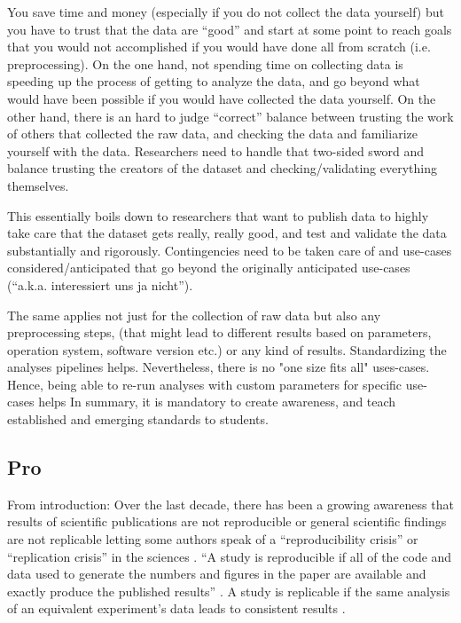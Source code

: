 %
You save time and money (especially if you do not collect the data yourself) but
you have to trust that the data are ``good'' and start at some point to reach
goals that you would not accomplished if you would have done all from scratch
(i.e. preprocessing).
%
On the one hand, not spending time on collecting data is speeding up the process
of getting to analyze the data, and go beyond what would have been possible if
you would have collected the data yourself.
%
On the other hand, there is an hard to judge ``correct'' balance between
trusting the work of others that collected the raw data, and checking the data
and familiarize yourself with the data.
%
Researchers need to handle that two-sided sword and balance trusting the
creators of the dataset and checking/validating everything themselves.

%
This essentially boils down to researchers that want to publish data to highly
take care that the dataset gets really, really good, and test and validate the
data substantially and rigorously.
%
Contingencies need to be taken care of and use-cases considered/anticipated that
go beyond the originally anticipated use-cases (``a.k.a. interessiert uns ja
nicht'').

%
The same applies not just for the collection of raw data but also any
preprocessing steps, (that might lead to different results based on parameters,
operation system, software version etc.) or any kind of results.
%
Standardizing the analyses pipelines helps.
%
Nevertheless, there is no "one size fits all" uses-cases.
%
Hence, being able to re-run analyses with custom parameters for specific
use-cases helps
%
In summary, it is mandatory to create awareness, and teach established and
emerging standards to students.


\subsection{Pro}




From introduction:
Over the last decade, there has been a growing awareness that results of
scientific publications are not reproducible or general scientific findings are
not replicable letting some authors speak of a ``reproducibility crisis'' or
``replication crisis'' in the sciences \citep{baker2016reproducibility,
plesser2018reproducibility, stupple2019reproducibility, nosek2022replicability}.
``A study is reproducible if all of the code and data used to generate the
numbers and figures in the paper are available and exactly produce the published
results'' \citep{leek2017most}.
A study is replicable if the same analysis of an equivalent experiment's data
leads to consistent results \citep{dubois2016building, leek2017most}.


